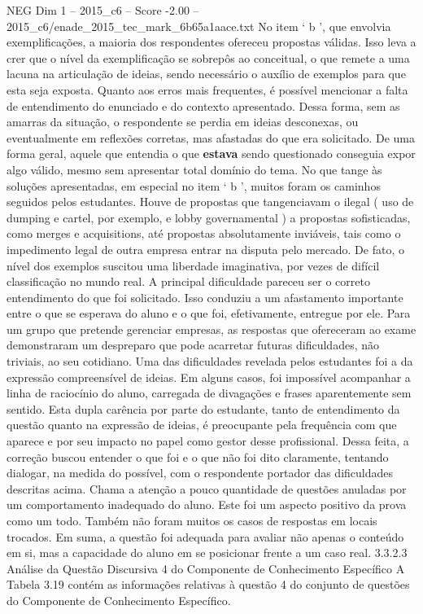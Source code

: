 \begin{textsample}{NEG Dim 1 – 2015\_c6 – Score -2.00 – 2015\_c6/enade\_2015\_tec\_mark\_6b65a1aace.txt}
No item ‘ b ’, que envolvia exemplificações, a maioria dos respondentes ofereceu propostas válidas.
Isso leva a crer que o nível da exemplificação se sobrepôs ao conceitual, o que remete a uma lacuna na articulação de ideias, sendo necessário o auxílio de exemplos para que esta seja exposta.
Quanto aos erros mais frequentes, é possível mencionar a falta de entendimento do enunciado e do contexto apresentado.
Dessa forma, sem as amarras da situação, o respondente se perdia em ideias desconexas, ou eventualmente em reflexões corretas, mas afastadas do que era solicitado.
De uma forma geral, aquele que entendia o que \textbf{estava} sendo questionado conseguia expor algo válido, mesmo sem apresentar total domínio do tema.
No que tange às soluções apresentadas, em especial no item ‘ b ’, muitos foram os caminhos seguidos pelos estudantes.
Houve de propostas que tangenciavam o ilegal ( uso de dumping e cartel, por exemplo, e lobby governamental ) a propostas sofisticadas, como merges e acquisitions, até propostas absolutamente inviáveis, tais como o impedimento legal de outra empresa entrar na disputa pelo mercado.
De fato, o nível dos exemplos suscitou uma liberdade imaginativa, por vezes de difícil classificação no mundo real.
A principal dificuldade pareceu ser o correto entendimento do que foi solicitado.
Isso conduziu a um afastamento importante entre o que se esperava do aluno e o que foi, efetivamente, entregue por ele.
Para um grupo que pretende gerenciar empresas, as respostas que ofereceram ao exame demonstraram um despreparo que pode acarretar futuras dificuldades, não triviais, ao seu cotidiano.
Uma das dificuldades revelada pelos estudantes foi a da expressão compreensível de ideias.
Em alguns casos, foi impossível acompanhar a linha de raciocínio do aluno, carregada de divagações e frases aparentemente sem sentido.
Esta dupla carência por parte do estudante, tanto de entendimento da questão quanto na expressão de ideias, é preocupante pela frequência com que aparece e por seu impacto no papel como gestor desse profissional.
Dessa feita, a correção buscou entender o que foi e o que não foi dito claramente, tentando dialogar, na medida do possível, com o respondente portador das dificuldades descritas acima.
Chama a atenção a pouco quantidade de questões anuladas por um comportamento inadequado do aluno.
Este foi um aspecto positivo da prova como um todo.
Também não foram muitos os casos de respostas em locais trocados.
Em suma, a questão foi adequada para avaliar não apenas o conteúdo em si, mas a capacidade do aluno em se posicionar frente a um caso real. 3.3.2.3 Análise da Questão Discursiva 4 do Componente de Conhecimento Específico A Tabela 3.19 contém as informações relativas à questão 4 do conjunto de questões do Componente de Conhecimento Específico.

\end{textsample}
